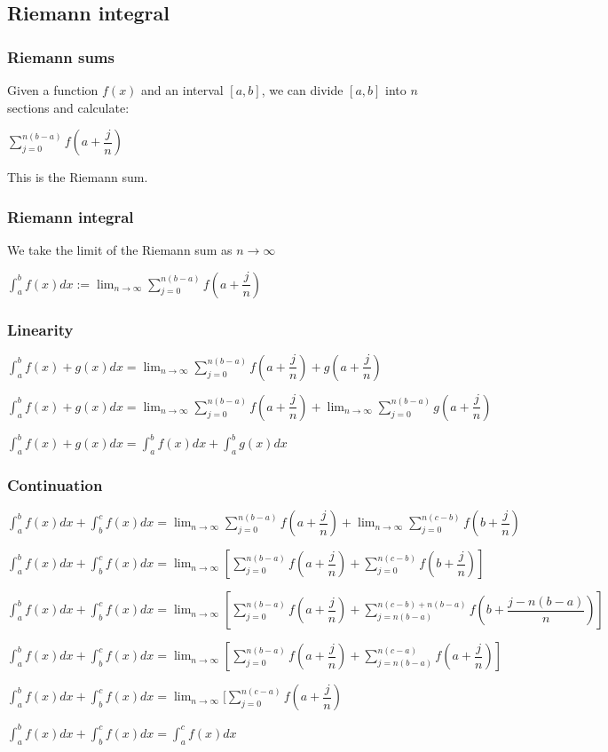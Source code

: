 
\subsection{Riemann integral}

\subsubsection{Riemann sums}

Given a function \(f(x)\) and an interval \([a,b]\), we can divide \([a,b]\) into \(n\) sections and calculate:

\(\sum_{j=0}^{n(b-a)}f(a+\dfrac{j}{n})\)

This is the Riemann sum.

\subsubsection{Riemann integral}

We take the limit of the Riemann sum as \(n\rightarrow \infty\)

\(\int_a^b f(x)dx:= \lim_{n\rightarrow \infty } \sum_{j=0}^{n(b-a)} f(a+ \dfrac{j}{n} )\)

\subsubsection{Linearity}

\(\int_a^bf(x)+g(x)dx=\lim_{n\rightarrow \infty }\sum_{j=0}^{n(b-a)}f(a+\dfrac{j}{n})+g(a+\dfrac{j}{n})\)

\(\int_a^bf(x)+g(x)dx=\lim_{n\rightarrow \infty }\sum_{j=0}^{n(b-a)}f(a+\dfrac{j}{n})+\lim_{n\rightarrow \infty }\sum_{j=0}^{n(b-a)}g(a+\dfrac{j}{n})\)

\(\int_a^bf(x)+g(x)dx=\int_a^bf(x)dx +\int_a^bg(x)dx\)

\subsubsection{Continuation}

\(\int_a^bf(x)dx+\int_b^cf(x)dx=\lim_{n\rightarrow \infty }\sum_{j=0}^{n(b-a)}f(a+\dfrac{j}{n})+\lim_{n\rightarrow \infty }\sum_{j=0}^{n(c-b)}f(b+\dfrac{j}{n})\)

\(\int_a^bf(x)dx+\int_b^cf(x)dx=\lim_{n\rightarrow \infty }[\sum_{j=0}^{n(b-a)}f(a+\dfrac{j}{n})+\sum_{j=0}^{n(c-b)}f(b+\dfrac{j}{n})]\)

\(\int_a^bf(x)dx+\int_b^cf(x)dx=\lim_{n\rightarrow \infty }[\sum_{j=0}^{n(b-a)}f(a+\dfrac{j}{n})+\sum_{j=n(b-a)}^{n(c-b)+n(b-a)}f(b+\dfrac{j-n(b-a)}{n})]\)

\(\int_a^bf(x)dx+\int_b^cf(x)dx=\lim_{n\rightarrow \infty }[\sum_{j=0}^{n(b-a)}f(a+\dfrac{j}{n})+\sum_{j=n(b-a)}^{n(c-a)}f(a+\dfrac{j}{n})]\)

\(\int_a^bf(x)dx+\int_b^cf(x)dx=\lim_{n\rightarrow \infty }[\sum_{j=0}^{n(c-a)}f(a+\dfrac{j}{n})\)

\(\int_a^bf(x)dx+\int_b^cf(x)dx=\int_a^cf(x)dx\)

